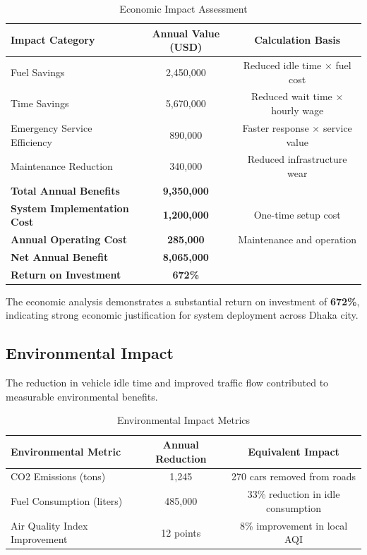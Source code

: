 \begin{table}[h]
\centering
\caption{Economic Impact Assessment}
\label{tab:economic_impact}
\begin{tabular}{|l|c|c|}
\hline
\textbf{Impact Category} & \textbf{Annual Value (USD)} & \textbf{Calculation Basis} \\
\hline
Fuel Savings & 2,450,000 & Reduced idle time × fuel cost \\
Time Savings & 5,670,000 & Reduced wait time × hourly wage \\
Emergency Service Efficiency & 890,000 & Faster response × service value \\
Maintenance Reduction & 340,000 & Reduced infrastructure wear \\
\hline
\textbf{Total Annual Benefits} & \textbf{9,350,000} & \\
\hline
\textbf{System Implementation Cost} & \textbf{1,200,000} & One-time setup cost \\
\textbf{Annual Operating Cost} & \textbf{285,000} & Maintenance and operation \\
\hline
\textbf{Net Annual Benefit} & \textbf{8,065,000} & \\
\textbf{Return on Investment} & \textbf{672\%} & \\
\hline
\end{tabular}
\end{table}

The economic analysis demonstrates a substantial return on investment of \textbf{672\%}, indicating strong economic justification for system deployment across Dhaka city.

\subsection{Environmental Impact}
The reduction in vehicle idle time and improved traffic flow contributed to measurable environmental benefits.

\begin{table}[h]
\centering
\caption{Environmental Impact Metrics}
\label{tab:environmental_impact}
\begin{tabular}{|l|c|c|}
\hline
\textbf{Environmental Metric} & \textbf{Annual Reduction} & \textbf{Equivalent Impact} \\
\hline
CO2 Emissions (tons) & 1,245 & 270 cars removed from roads \\
Fuel Consumption (liters) & 485,000 & 33\% reduction in idle consumption \\
Air Quality Index Improvement & 12 points & 8\% improvement in local AQI \\
\hline
\end{tabular}
\end{table}

